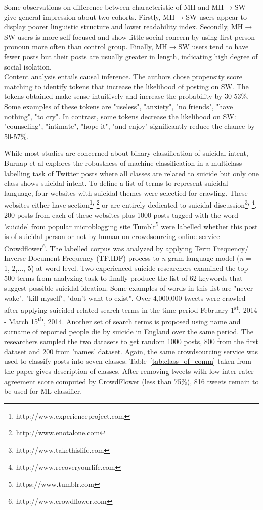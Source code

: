 Some observations on difference between characteristic of MH and  MH$\rightarrow$SW give general impression about two cohorts. Firstly, MH$\rightarrow$SW users appear to display poorer linguistic structure and lower readability index. Secondly,  MH$\rightarrow$SW users is more self-focused and show little social concern by using first person pronoun more often than control group. Finally, MH$\rightarrow$SW users tend to have fewer posts but their posts are usually greater in length, indicating high degree of social isolation.\\
Content analysis entails causal inference. The authors chose propensity score matching to identify tokens that increase the likelihood of posting on SW. The tokens obtained make sense intuitively and increase the probability by 30-53\%. Some examples of these tokens are "useless", "anxiety", "no friends", "have nothing", "to cry". In contrast, some tokens decrease the likelihood on SW: "counseling", "intimate", "hope it", "and enjoy" significantly reduce the chance by 50-57\%.


While most studies are concerned about binary classification of suicidal intent, Burnap et al \cite{Burnap2015} explores the robustness of machine classification in a multiclass labelling task of Twitter posts where all classes are related to suicide but only one class shows suicidal intent. To define a list of terms to represent suicidal language, four websites with suicidal themes were selectied for crawling. These websites either have section\footnote{http://www.experienceproject.com}\textsuperscript{, }\footnote{http://www.enotalone.com} or are entirely dedicated to suicidal discussion\footnote{http://www.takethislife.com}\textsuperscript{, }\footnote{http://www.recoveryourlife.com}. 200 posts from each of these websites plus 1000 posts tagged with the word 'suicide' from popular microblogging site Tumblr\footnote{https://www.tumblr.com} were labelled whether this post is of suicidal person or not by human on crowdsourcing online service Crowdflower\footnote{http://www.crowdflower.com}. The labelled corpus was analyzed by applying Term Frequency/ Inverse Document Frequency (TF.IDF) process to \textit{n}-gram language model (\textit{n} = 1, 2,..., 5) at word level. Two experienced suicide researchers examined the top 500 terms from analyzing task to finally produce the list of 62 keywords that suggest possible suicidal ideation. Some examples of words in this list are "never wake", "kill myself", "don't want to exist". Over 4,000,000 tweets were crawled after applying suicided-related search terms in the time period  February 1\textsuperscript{st}, 2014 - March 15\textsuperscript{th}, 2014. Another set of search terms is proposed using name and surname of reported people die by suicide in England over the same period. The researchers sampled the two datasets to get random 1000 posts, 800 from the first dataset and 200 from 'names' dataset. Again, the same crowdsourcing service was used to classify posts into seven classes. Table~\ref{tab:class_of_comm} taken from the paper gives description of classes. After removing tweets with low inter-rater agreement score computed by CrowdFlower (less than 75\%), 816 tweets remain to be used for ML classifier.

